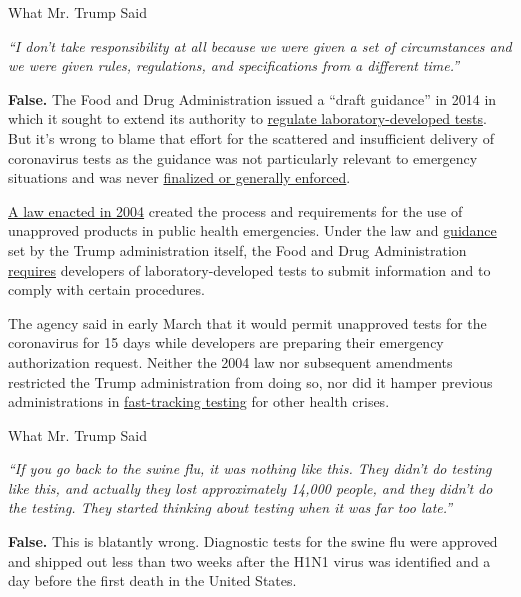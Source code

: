 What Mr. Trump Said

\emph{``I don't take responsibility at all because we were given a set
of circumstances and we were given rules, regulations, and
specifications from a different time.''}

\textbf{False.} The Food and Drug Administration issued a ``draft
guidance'' in 2014 in which it sought to extend its authority to
\href{https://www.nytimes3xbfgragh.onion/2014/08/01/business/fda-to-regulate-lab-developed-test-kits.html}{regulate
laboratory-developed tests}. But it's wrong to blame that effort for the
scattered and insufficient delivery of coronavirus tests as the guidance
was not particularly relevant to emergency situations and was never
\href{https://www.fda.gov/media/102367/download}{finalized or generally
enforced}.

\href{https://fas.org/sgp/crs/terror/R43607.pdf}{A law enacted in 2004}
created the process and requirements for the use of unapproved products
in public health emergencies. Under the law and
\href{https://www.cms.gov/Medicare/Provider-Enrollment-and-Certification/SurveyCertificationGenInfo/Policy-and-Memos-to-States-and-Regions-Items/QSO18-19-CLIA?DLPage=2\&DLEntries=10\&DLSort=3\&DLSortDir=descending}{guidance}
set by the Trump administration itself, the Food and Drug Administration
\href{http://archive.is/lgqI6\#ldt}{requires} developers of
laboratory-developed tests to submit information and to comply with
certain procedures.

The agency said in early March that it would permit unapproved tests for
the coronavirus for 15 days while developers are preparing their
emergency authorization request. Neither the 2004 law nor subsequent
amendments restricted the Trump administration from doing so, nor did it
hamper previous administrations in
\href{https://www.fda.gov/medical-devices/emergency-situations-medical-devices/historical-information-about-device-emergency-use-authorizations}{fast-tracking
testing} for other health crises.

What Mr. Trump Said

\emph{``If you go back to the swine flu, it was nothing like this. They
didn't do testing like this, and actually they lost approximately 14,000
people, and they didn't do the testing. They started thinking about
testing when it was far too late.''}

\textbf{False.} This is blatantly wrong. Diagnostic tests for the swine
flu were approved and shipped out less than two weeks after the H1N1
virus was identified and a day before the first death in the United
States.


